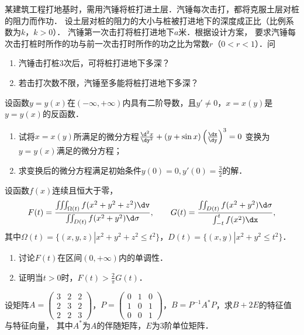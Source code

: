 \documentclass[plain,noanswer,medmath]{../../template/jnuexam}
\begin{document}

\begin{problem}
某建筑工程打地基时，需用汽锤将桩打进土层．汽锤每次击打，都将克服土层对桩的阻力而作功．
设土层对桩的阻力的大小与桩被打进地下的深度成正比（比例系数为$k$，$k > 0$）．
汽锤第一次击打将桩打进地下$a$米．根据设计方案，
要求汽锤每次击打桩时所作的功与前一次击打时所作的功之比为常数$r$（$0 < r < 1$）．问
\begin{enumerate}
\item 汽锤击打桩$3$次后，可将桩打进地下多深？
\item 若击打次数不限，汽锤至多能将桩打进地下多深？
\end{enumerate}
\end{problem}



\begin{problem}
设函数$y = y(x)$在$(-\infty , +\infty)$内具有二阶导数，且$y' \ne 0$，$x = x(y)$是$y = y(x)$的反函数．
\begin{enumerate}
\item 试将$x = x(y)$所满足的微分方程$\frac{\d^2x}{\dy^2} + (y + \sin x) \left(\frac{\dx}{\dy} \right)^3 = 0$
变换为$y = y(x)$满足的微分方程；
\item 求变换后的微分方程满足初始条件$y(0) = 0,y'(0) = \frac{3}{2}$的解．
\end{enumerate}
\end{problem}



\begin{problem}
设函数$f(x)$连续且恒大于零，
$$F(t) = \frac{\iiint_{\Omega(t)} f(x^2 + y^2 + z^2)\dv}{\iint_{D(t)} f(x^2 + y^2)\d\sigma},\qquad
  G(t) = \frac{\iint_{D(t)} f(x^2 + y^2)\d\sigma}{\int_{- t}^t f(x^2)\dx},$$
其中$\Omega (t) = \{(x,y,z)\left| x^2 + y^2 + z^2 \right. \le t^2\}$，$D(t)=\{(x,y)\left| x^2 + y^2 \right. \le t^2\}$．
\begin{enumerate}
\item 讨论$F(t)$在区间$(0, +\infty)$内的单调性．
\item 证明当$t > 0$时，$F(t) > \frac{2}{\pi}G(t)$．
\end{enumerate}
\end{problem}



\begin{problem}
设矩阵$A = \begin{pmatrix}
  3 & 2 & 2 \\
  2 & 3 & 2 \\
  2 & 2 & 3
\end{pmatrix}$，$P = \begin{pmatrix}
  0 & 1 & 0 \\
  1 & 0 & 1 \\
  0 & 0 & 1
\end{pmatrix}$，$B = P^{-1}A^* P$，求$B + 2E$的特征值与特征向量，
其中$A^*$为$A$的伴随矩阵，$E$为$3$阶单位矩阵．
\end{problem}
\end{document}
